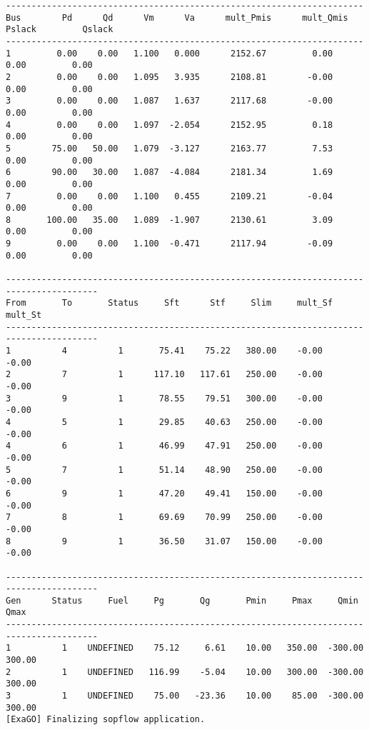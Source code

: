 \begin{lstlisting}
----------------------------------------------------------------------
Bus        Pd      Qd      Vm      Va      mult_Pmis      mult_Qmis      Pslack         Qslack        
----------------------------------------------------------------------
1         0.00    0.00   1.100   0.000      2152.67         0.00         0.00         0.00
2         0.00    0.00   1.095   3.935      2108.81        -0.00         0.00         0.00
3         0.00    0.00   1.087   1.637      2117.68        -0.00         0.00         0.00
4         0.00    0.00   1.097  -2.054      2152.95         0.18         0.00         0.00
5        75.00   50.00   1.079  -3.127      2163.77         7.53         0.00         0.00
6        90.00   30.00   1.087  -4.084      2181.34         1.69         0.00         0.00
7         0.00    0.00   1.100   0.455      2109.21        -0.04         0.00         0.00
8       100.00   35.00   1.089  -1.907      2130.61         3.09         0.00         0.00
9         0.00    0.00   1.100  -0.471      2117.94        -0.09         0.00         0.00

----------------------------------------------------------------------------------------
From       To       Status     Sft      Stf     Slim     mult_Sf  mult_St 
----------------------------------------------------------------------------------------
1          4          1       75.41    75.22   380.00    -0.00    -0.00
2          7          1      117.10   117.61   250.00    -0.00    -0.00
3          9          1       78.55    79.51   300.00    -0.00    -0.00
4          5          1       29.85    40.63   250.00    -0.00    -0.00
4          6          1       46.99    47.91   250.00    -0.00    -0.00
5          7          1       51.14    48.90   250.00    -0.00    -0.00
6          9          1       47.20    49.41   150.00    -0.00    -0.00
7          8          1       69.69    70.99   250.00    -0.00    -0.00
8          9          1       36.50    31.07   150.00    -0.00    -0.00

----------------------------------------------------------------------------------------
Gen      Status     Fuel     Pg       Qg       Pmin     Pmax     Qmin     Qmax  
----------------------------------------------------------------------------------------
1          1    UNDEFINED    75.12     6.61    10.00   350.00  -300.00   300.00
2          1    UNDEFINED   116.99    -5.04    10.00   300.00  -300.00   300.00
3          1    UNDEFINED    75.00   -23.36    10.00    85.00  -300.00   300.00
[ExaGO] Finalizing sopflow application.
\end{lstlisting}

